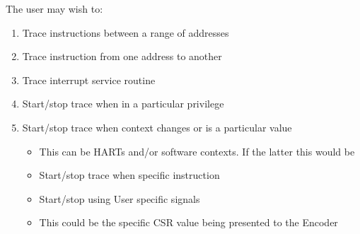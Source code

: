 The user may wish to:

\begin{enumerate}
  \item Trace instructions between a range of addresses
  \item Trace instruction from one address to another
  \item Trace interrupt service routine
  \item Start/stop trace when in a particular privilege 
  \item Start/stop trace when context changes or is a particular value
  \begin {itemize}
    \item This can be HARTs and/or software contexts. If the latter this would be 
    \item Start/stop trace when specific instruction
    \item Start/stop using User specific signals 
    \item This could be the specific CSR value being presented to the Encoder
  \end{itemize}
\end{enumerate}
